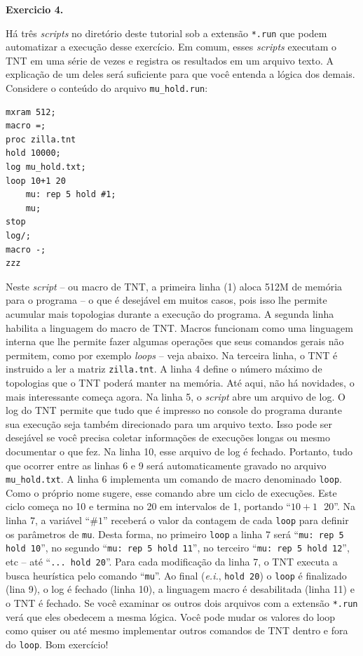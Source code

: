 \begin{refsection}
\begin{blackBlock}{\textbf{Exercicio 4.}}
\end{blackBlock}

Há três \textit{scripts} no diretório deste tutorial sob a extensão \texttt{*.run} que podem automatizar a execução desse exercício. Em comum, esses \textit{scripts} executam o TNT em uma série de vezes e registra os resultados em um arquivo texto. A explicação de um deles será suficiente para que você entenda a lógica dos demais. Considere o conteúdo do arquivo \texttt{mu\_hold.run}:

\begin{lstlisting}[label=tut4:tnt_macro]
mxram 512;
macro =;
proc zilla.tnt
hold 10000;
log mu_hold.txt;
loop 10+1 20
    mu: rep 5 hold #1;
    mu;
stop
log/;
macro -;
zzz
\end{lstlisting}


Neste \textit{script} -- ou macro de TNT, a primeira linha (1) aloca 512M de memória para o programa -- o que é desejável em muitos casos, pois isso lhe permite acumular mais topologias durante a execução do programa. A segunda linha habilita a linguagem do macro de TNT. Macros funcionam como uma linguagem interna que lhe permite fazer algumas operações que seus comandos gerais não permitem, como por exemplo \textit{loops} -- veja abaixo. Na terceira linha, o TNT é instruido a ler a matriz \texttt{zilla.tnt}. A linha 4 define o número máximo de topologias que o TNT poderá manter na memória. Até aqui, não há novidades, o mais interessante começa agora. Na linha 5, o \textit{script} abre um arquivo de log. O log do TNT permite que tudo que é impresso no console do programa durante sua execução seja também direcionado para um arquivo texto. Isso pode ser desejável se você precisa coletar informações de execuções longas ou mesmo documentar o que fez. Na linha 10, esse arquivo de log é fechado. Portanto, tudo que ocorrer entre as linhas 6 e 9 será automaticamente gravado no arquivo \texttt{mu\_hold.txt}. A linha 6 implementa um comando de macro denominado \texttt{loop}. Como o próprio nome sugere, esse comando abre um ciclo de execuções. Este ciclo começa no 10 e termina no 20 em intervalos de 1, portando ``$10+1~~~20$''. Na linha 7, a variável ``$\#1$'' receberá o valor da contagem de cada \texttt{loop} para definir os parâmetros de \texttt{mu}. Desta forma, no primeiro \texttt{loop} a linha 7 será ``\texttt{mu: rep 5 hold 10}'', no segundo ``\texttt{mu: rep 5 hold 11}'', no terceiro ``\texttt{mu: rep 5 hold 12}'', etc -- até  ``\texttt{... hold 20}''. Para cada modificação da linha 7, o TNT executa a busca heurística pelo comando ``\texttt{mu}''. Ao final (\textit{e.i.}, \texttt{hold 20}) o \texttt{loop} é finalizado (lina 9), o log é fechado (linha 10), a linguagem macro é desabilitada (linha 11) e o TNT é fechado. Se você examinar os outros dois arquivos com a extensão \texttt{*.run} verá que eles obedecem a mesma lógica. Você pode mudar os valores do loop como quiser ou até mesmo implementar outros comandos de TNT dentro e fora do \texttt{loop}. Bom exercício!





\end{refsection}
